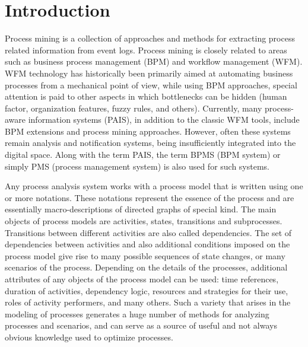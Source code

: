 \documentclass[
11pt,%
tightenlines,%
twoside,%
onecolumn,%
nofloats,%
nobibnotes,%
nofootinbib,%
superscriptaddress,%
noshowpacs,%
centertags]%
{revtex4}
\begin{document}
\maketitle

\section{Introduction}

Process mining is a collection of approaches and methods for extracting process related information from event logs.
Process mining is closely related to areas such as business process management (BPM) and workflow management (WFM).
WFM technology has historically been primarily aimed at automating business processes from a mechanical point of view, while using BPM approaches, special attention is paid to other aspects in which bottlenecks can be hidden (human factor, organization features, fuzzy rules, and others).
Currently, many process-aware information systems (PAIS), in addition to the classic WFM tools, include BPM extensions and process mining approaches.
However, often these systems remain analysis and notification systems, being insufficiently integrated into the digital space.
Along with the term PAIS, the term BPMS (BPM system) or simply PMS (process management system) is also used for such systems.

Any process analysis system works with a process model that is written using one or more notations.
These notations represent the essence of the process and are essentially macro-descriptions of directed graphs of special kind.
The main objects of process models are activities, states, transitions and subprocesses.
Transitions between different activities are also called dependencies.
The set of dependencies between activities and also additional conditions imposed on the process model give rise to many possible sequences of state changes, or many scenarios of the process.
Depending on the details of the processes, additional attributes of any objects of the process model can be used: time references, duration of activities, dependency logic, resources and strategies for their use, roles of activity performers, and many others.
Such a variety that arises in the modeling of processes generates a huge number of methods for analyzing processes and scenarios, and can serve as a source of useful and not always obvious knowledge used to optimize processes.
\end{document}
